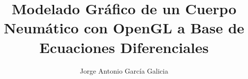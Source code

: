 \documentclass[12pt,letterpaper,spanish]{book}%
\begin{document}
\author{Jorge Antonio García Galicia}
\title{Modelado Gráfico de un Cuerpo Neumático con OpenGL a Base de Ecuaciones Diferenciales}
\maketitle


\setcounter{page}{1}
\tableofcontents
\listoffigures
\listoftables
{}











\begin{appendix}
\appendix

\end{appendix}





\thispagestyle{empty}


\nocite{*}
\end{document}
